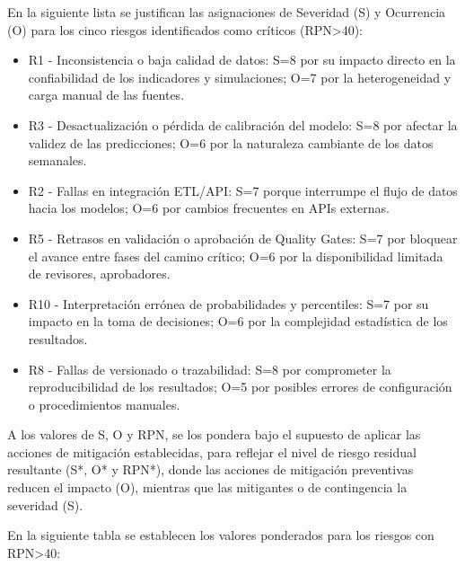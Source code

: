 \documentclass[12pt]
{charter}
\begin{document}
En la siguiente lista se justifican las asignaciones de Severidad (S) y Ocurrencia (O) para los cinco riesgos identificados como críticos (RPN>40):

\begin{itemize}
  \item R1 - Inconsistencia o baja calidad de datos:
  S=8 por su impacto directo en la confiabilidad de los indicadores y simulaciones;
  O=7 por la heterogeneidad y carga manual de las fuentes.
  \item R3 - Desactualización o pérdida de calibración del modelo:
  S=8 por afectar la validez de las predicciones;
  O=6 por la naturaleza cambiante de los datos semanales.
  \item R2 - Fallas en integración ETL/API:
  S=7 porque interrumpe el flujo de datos hacia los modelos;
  O=6 por cambios frecuentes en APIs externas.
  \item R5 - Retrasos en validación o aprobación de Quality Gates:
  S=7 por bloquear el avance entre fases del camino crítico;
  O=6 por la disponibilidad limitada de revisores, aprobadores.
  \item R10 - Interpretación errónea de probabilidades y percentiles:
  S=7 por su impacto en la toma de decisiones;
  O=6 por la complejidad estadística de los resultados.
  \item R8 - Fallas de versionado o trazabilidad:
  S=8 por comprometer la reproducibilidad de los resultados;
  O=5 por posibles errores de configuración o procedimientos manuales.
\end{itemize}

A los valores de S, O y RPN, se los pondera bajo el supuesto de aplicar las acciones de mitigación establecidas, para reflejar el nivel de riesgo residual resultante (S*, O* y RPN*), donde las acciones de mitigación preventivas reducen el impacto (O), mientras que las mitigantes o de contingencia la severidad (S).

En la siguiente tabla se establecen los valores ponderados para los riesgos con RPN>40:
\end{document}
